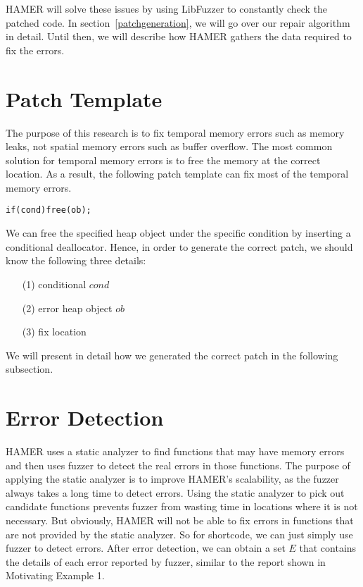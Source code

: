 \documentclass[a4paper,11pt,oneside,openany]{book}
\begin{document}
HAMER will solve these issues by using LibFuzzer to constantly check the patched code. In section~\ref{patchgeneration}, we will go over our repair algorithm in detail. Until then, we will describe how HAMER gathers the data required to fix the errors.

\section{Patch Template}
The purpose of this research is to fix temporal memory errors such as memory leaks, not spatial memory errors such as buffer overflow. The most common solution for temporal memory errors is to free the memory at the correct location. As a result, the following patch template can fix most of the temporal memory errors.


\begin{minipage}{\textwidth}
    \vspace{0.2cm}
    \hspace{0.3cm}\verb|if(cond)free(ob);|\\
\end{minipage}
We can free the specified heap object under the specific condition by inserting a conditional deallocator. Hence, in order to generate the correct patch, we should know the following three details:
\begin{itemize}
  \item[(1)] conditional $cond$
  \item[(2)] error heap object $ob$
  \item[(3)] fix location
\end{itemize}
We will present in detail how we generated the correct patch in the following subsection.

\section{Error Detection}
HAMER uses a static analyzer to find functions that may have memory errors and then uses fuzzer to detect the real errors in those functions. The purpose of applying the static analyzer is to improve HAMER's scalability, as the fuzzer always takes a long time to detect errors. Using the static analyzer to pick out candidate functions prevents fuzzer from wasting time in locations where it is not necessary. But obviously, HAMER will not be able to fix errors in functions that are not provided by the static analyzer. So for shortcode, we can just simply use fuzzer to detect errors. After error detection, we can obtain a set $E$ that contains the details of each error reported by fuzzer, similar to the report shown in Motivating Example 1.
\end{document}
